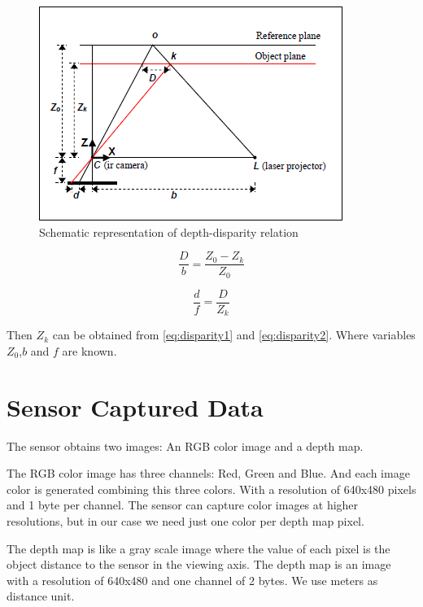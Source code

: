 \begin{figure}[h!]
\begin{center}
\includegraphics[scale=1]{images/kinect_triangulation}
\caption{Schematic representation of depth-disparity relation \cite{khoshelham2011accuracy}}
\label{fig:disparity}
\end{center}
\end{figure}

\begin{equation}
\label{eq:disparity1}
 \frac{D}{b} = \frac{Z_0 - Z_k}{Z_0} 
\end{equation}


\begin{equation}
\label{eq:disparity2}
 \frac{d}{f} = \frac{D}{Z_k} 
\end{equation}

Then $Z_k$ can be obtained from \ref{eq:disparity1} and \ref{eq:disparity2}. Where variables $Z_0$,$b$ and $f$ are known.

\section{Sensor Captured Data}
\label{sec:sensor_data}

The sensor obtains two images: An RGB color image and a depth map. 

The RGB color image has three channels: Red, Green and Blue. And each image color is generated 
combining this three colors. With a resolution of 640x480 pixels and 1 byte per channel. The sensor can 
capture color images at higher resolutions, but in our case we need just one color per depth map pixel.

The depth map is like a gray scale image where the value of each pixel is the object distance to the sensor in the viewing axis. 
The depth map is an image with a resolution of 640x480 and one channel of 2 bytes. We use meters as distance unit.

